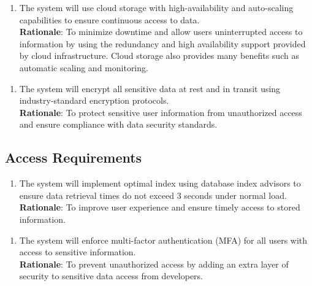 \documentclass{article}
\begin{document}
\begin{enumerate}[{SR}8. ]
    \item The system will use cloud storage with high-availability and auto-scaling capabilities to ensure continuous access to data.\\
    \textbf{Rationale}: To minimize downtime and allow users uninterrupted access to information by using the redundancy and high availability support provided by cloud infrastructure. Cloud storage also provides many benefits such as automatic scaling and monitoring. 
\end{enumerate} 
\begin{enumerate}[{SR}9. ]
    \item The system will encrypt all sensitive data at rest and in transit using industry-standard encryption protocols.\\
    \textbf{Rationale}: To protect sensitive user information from unauthorized access and ensure compliance with data security standards.
\end{enumerate}

\subsection{Access Requirements}
\begin{enumerate}[{AR}1. ]
    \item The system will implement optimal index using database index advisors to ensure data retrieval times do not exceed 3 seconds under normal load.\\
    \textbf{Rationale}: To improve user experience and ensure timely access to stored information.
\end{enumerate} 
\begin{enumerate}[{AR}2. ]
    \item The system will enforce multi-factor authentication (MFA) for all users with access to sensitive information. \\
    \textbf{Rationale}: To prevent unauthorized access by adding an extra layer of security to sensitive data access from developers.
\end{enumerate} 
\end{document}
